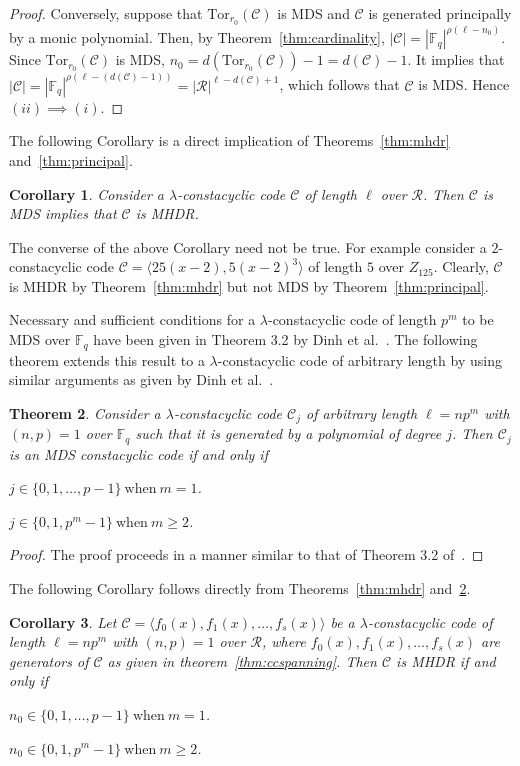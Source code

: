 \documentclass[12pt,a4paper]{article}
\newtheorem{theorem}{Theorem}[section]
\newtheorem{corollary}[theorem]{Corollary}
\begin{document}
\begin{proof}
    Conversely, suppose that $\mathrm{Tor}_{r_0}(\mathcal{C})$ is MDS and $\mathcal{C}$ is generated principally by a monic polynomial. Then, by Theorem~\ref{thm:cardinality}, $|\mathcal{C}|=|\mathbb{F}_q|^{\rho(\ell-n_0)}$. Since $\mathrm{Tor}_{r_0}(\mathcal{C})$ is MDS, $n_0=d(\mathrm{Tor}_{r_0}(\mathcal{C}))-1=d(\mathcal{C})-1$. 
    It implies that $|\mathcal{C}|=|\mathbb{F}_q|^{\rho(\ell-(d(\mathcal{C})-1))}=|\mathcal{R}|^{\ell-d(\mathcal{C})+1}$, which follows that $\mathcal{C}$ is MDS. Hence $(ii) \implies(i)$.
    \end{proof}

    The following Corollary is a direct implication of Theorems~\ref{thm:mhdr} and~\ref{thm:principal}.

\begin{corollary}
     Consider a $\lambda$-constacyclic code $\mathcal{C}$ of length $\ell$ over $\mathcal{R}$. Then $\mathcal{C}$ is MDS implies that $\mathcal{C}$ is MHDR.
\end{corollary}
The converse of the above Corollary need not be true. For example consider a $2$-constacyclic code $\mathcal{C}=\langle25(x-2),5(x-2)^3\rangle$ of length $5$ over $Z_{125}$. Clearly, $\mathcal{C}$ is MHDR by Theorem~\ref{thm:mhdr} but not MDS by Theorem~\ref{thm:principal}.

\medskip
Necessary and sufficient conditions for a $\lambda$-constacyclic code of length $p^m$ to be MDS over $\mathbb{F}_q$ have been given in Theorem 3.2 by Dinh et al.~\cite{dinh2020mds}. The following theorem extends this result to a $\lambda$-constacyclic code of arbitrary length by using similar arguments as given by Dinh et al.~\cite{dinh2020mds}.
\begin{theorem}\label{thm:dinhdistance}
    Consider a $\lambda$-constacyclic code $\mathcal{C}_j$ of arbitrary length $\ell=np^m$ with $(n,p)=1$ over $\mathbb{F}_q$ such that it is generated by a polynomial of degree $j$. Then $\mathcal{C}_j$ is an MDS constacyclic code if and only if \item[(i)] $j \in \{ 0, 1, \dots, p-1\} ~\text{when}~m=1$. \item[(ii)] $j \in \{0,1,p^m-1\}~\text{when}~m \ge 2$.
\end{theorem}
\begin{proof}
    The proof proceeds in a manner similar to that of Theorem 3.2 of~\cite{dinh2020mds}.
\end{proof}

The following Corollary follows directly from Theorems~\ref{thm:mhdr} and~\ref{thm:dinhdistance}.
\begin{corollary}\label{cor:nnote}
    Let $\mathcal{C}= \langle f_0(x),f_1(x), \dots , f_s(x) \rangle $ be a $\lambda$-constacyclic code of length $\ell=np^m$ with $(n,p)=1$ over $\mathcal{R}$, where $f_0(x),f_1(x), \dots ,f_s(x)$ are generators of $\mathcal{C}$ as given in theorem~\ref{thm:ccspanning}. Then $\mathcal{C}$ is MHDR if and only if \item[(i)] $n_0 \in \{ 0, 1, \dots, p-1\} ~\text{when}~m=1$. \item[(ii)] $n_0 \in \{0,1,p^m-1\}~\text{when}~m \ge 2$.
\end{corollary}
\end{document}
